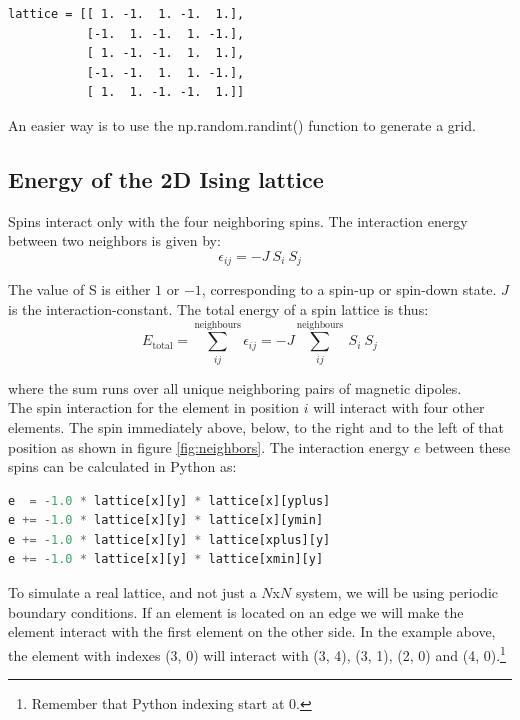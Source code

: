 \documentclass{article}
\begin{document}
\begin{lstlisting}
lattice = [[ 1. -1.  1. -1.  1.],
           [-1.  1. -1.  1. -1.],
           [ 1. -1. -1.  1.  1.],
           [-1. -1.  1.  1. -1.],
           [ 1.  1. -1. -1.  1.]]
\end{lstlisting}

An easier way is to use the np.random.randint() function to generate a grid.

\subsection{Energy of the 2D Ising lattice} \label{section:energy}

Spins interact only with the four neighboring spins. The interaction energy between two neighbors is given by:
\begin{equation}
\epsilon_{ij} = -J \ S_i \ S_j
\end{equation} 

The value of S is either $1$ or $-1$, corresponding to a spin-up or spin-down state. $J$ is the interaction-constant.
The total energy of a spin lattice is thus:
\begin{equation}
E_{\mathrm{total}}=\sum^{\mathrm{neighbours}}_{ij} \epsilon_{ij} = -J \sum^{\mathrm{neighbours}}_{ij} \ S_i \ S_j
\end{equation}

where the sum runs over all unique neighboring pairs of magnetic dipoles.\\

The spin interaction for the element in position $i$ will interact with four other elements.
The spin immediately above, below, to the right and to the left of that position as shown in figure \ref{fig:neighbors}.
The interaction energy $e$ between these spins can be calculated in Python as:

\begin{lstlisting}[language=python]
e  = -1.0 * lattice[x][y] * lattice[x][yplus]
e += -1.0 * lattice[x][y] * lattice[x][ymin]
e += -1.0 * lattice[x][y] * lattice[xplus][y]
e += -1.0 * lattice[x][y] * lattice[xmin][y]
\end{lstlisting}

To simulate a real lattice, and not just a $N$x$N$ system, we will be using
periodic boundary conditions.
If an element is located on an edge we will make the element interact with the first element on the other side.
In the example above, the element with indexes (3, 0) will interact with (3, 4), (3, 1), (2, 0) and (4, 0).\footnote{Remember that Python indexing start at 0.}\\
\end{document}
